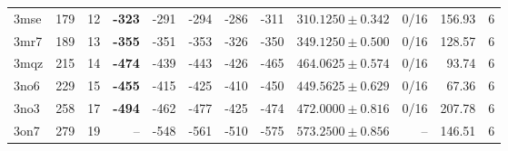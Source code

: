\begin{tabular}{@{}lrrrrrrrrrrr@{}}
3mse & 179 & 12 & \textbf{-323} & -291 & -294 & -286 & -311 & $310.1250\pm0.342$ & 0/16 & 156.93 & 6 \\
3mr7 & 189 & 13 & \textbf{-355} & -351 & -353 & -326 & -350 & $349.1250\pm0.500$ & 0/16 & 128.57 & 6 \\
3mqz & 215 & 14 & \textbf{-474} & -439 & -443 & -426 & -465 & $464.0625\pm0.574$ & 0/16 & 93.74 & 6 \\
3no6 & 229 & 15 & \textbf{-455} & -415 & -425 & -410 & -450 & $449.5625\pm0.629$ & 0/16 & 67.36 & 6 \\
3no3 & 258 & 17 & \textbf{-494} & -462 & -477 & -425 & -474 & $472.0000\pm0.816$ & 0/16 & 207.78 & 6 \\
3on7 & 279 & 19 & -- & -548 & -561 & -510 & -575 & $573.2500\pm0.856$ & -- & 146.51 & 6 \\
\bottomrule
\end{tabular}
